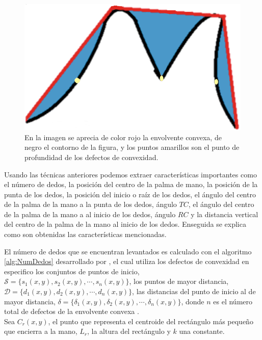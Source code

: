 \begin{figure}[h!]
\begin{center}
\includegraphics[scale=.4]{./Figures/ConvexHullAndDefects.png}
\end{center}
\caption{En la imagen se aprecia de color rojo la envolvente convexa, de negro el contorno de la figura, y los puntos amarillos son el punto de profundidad de los defectos de convexidad.}
\label{fig:FigConvexHullDefects}
\end{figure}  

Usando las técnicas anteriores podemos extraer características importantes como el número de dedos, la posición del centro de la palma de mano, la posición de la punta de los dedos, la posición del inicio o raíz de los dedos, el ángulo del centro de la palma de la mano a la punta de los dedos, ángulo $TC$, el ángulo del centro de la palma de la mano a al inicio de los dedos, ángulo $RC$ y la distancia vertical del centro de la palma de la mano al inicio de los dedos. Enseguida se explica como son obtenidas las características mencionadas. 

El número de dedos que se encuentran levantados es calculado con el algoritmo \ref{alg:NumDedos} desarrollado por \citep{Kathuria2011}, el cual utiliza los defectos de convexidad en especifico los conjuntos de puntos de inicio, $\mathcal{S}=\lbrace s_1(x,y), s_2(x,y), \cdots, s_n(x,y) \rbrace$, los puntos de mayor distancia, $\mathcal{D}=\lbrace d_1(x,y), d_2(x,y), \cdots, d_n(x,y) \rbrace$, las distancias del punto de inicio al de mayor distancia, $\mathcal{\delta}=\lbrace \delta_1(x,y), \delta_2(x,y), \cdots, \delta_n(x,y) \rbrace$, donde $n$ es el número total de defectos de la envolvente convexa .\\
Sea $C_r(x,y)$, el punto que representa el centroide del rectángulo más pequeño que encierra a la mano, $L_r$, la altura del rectángulo y $k$ una constante. 


